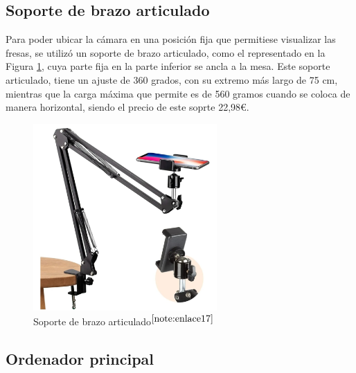 \setcounter{footnote}{16}

\subsection{Soporte de brazo articulado}
\label{subsec:soporte_camara}

Para poder ubicar la cámara en una posición fija que permitiese visualizar las fresas, se utilizó un soporte de brazo articulado, como el representado en la Figura \ref{fig:soporte_camara}, cuya parte fija en la parte inferior se ancla a la mesa. Este soporte articulado, tiene un ajuste de 360 grados, con su extremo más largo de 75 cm, mientras que la carga máxima que permite es de 560 gramos cuando se coloca de manera horizontal, siendo el precio de este soprte 22,98€.

\begin{figure} [H]
    \begin{center}
      \includegraphics[width=7cm]{figs/Soporte de brazo articulado.jpeg}
    \end{center}
    \caption{Soporte de brazo articulado$^{\ref{note:enlace17}}$}
    \label{fig:soporte_camara}
\end{figure}
 
\setcounter{footnote}{17} 

\subsection{Ordenador principal}
\label{subsec:ordenador}

